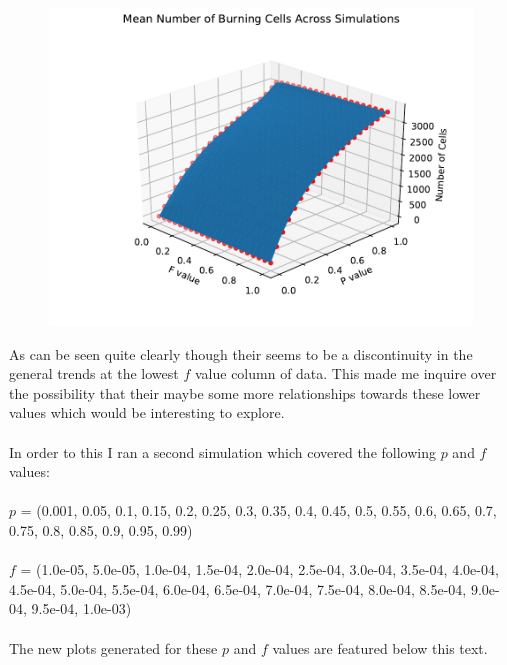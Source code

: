 \documentclass{article}
\begin{document}
\begin{figure}[H]
\centering
\includegraphics[scale=0.6]{Burning Mean 3D.pdf}
\label{fig:burnmean3D}
\end{figure}
As can be seen quite clearly though their seems to be a discontinuity in the general trends at the lowest $f$ value column of data. This made me inquire over the possibility that their maybe some more relationships towards these lower values which would be interesting to explore.\\
\\
In order to this I ran a second simulation which covered the following $p$ and $f$ values:\\
\\
$p$ = (0.001, 0.05, 0.1, 0.15, 0.2, 0.25, 0.3, 0.35, 0.4, 0.45, 0.5, 0.55, 0.6, 0.65, 0.7, 0.75, 0.8, 0.85, 0.9, 0.95, 0.99)\\
\\
$f$ = (1.0e-05, 5.0e-05, 1.0e-04, 1.5e-04, 2.0e-04, 2.5e-04, 3.0e-04, 3.5e-04, 4.0e-04, 4.5e-04, 5.0e-04, 5.5e-04, 6.0e-04, 6.5e-04, 7.0e-04, 7.5e-04, 8.0e-04, 8.5e-04, 9.0e-04, 9.5e-04, 1.0e-03)\\
\\
The new plots generated for these $p$ and $f$ values are featured below this text.
\end{document}

